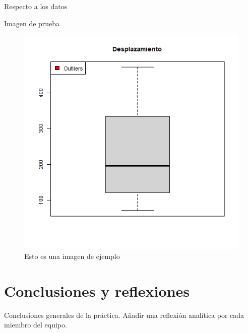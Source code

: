 \documentclass[sigconf]{acmart}
\begin{document}
Respecto a los datos 

Imagen de prueba

\begin{figure}
	\centering
	\includegraphics[width=0.7\linewidth]{img/dispBoxplot}
	\caption{Esto es una imagen de ejemplo}
	\label{fig:dispboxplot}
\end{figure}



\section{Conclusiones y reflexiones}

Conclusiones generales de la pr{\'a}ctica. A\~nadir una reflexi{\'o}n anal{\'i}tica por cada miembro del equipo.



\end{document}

